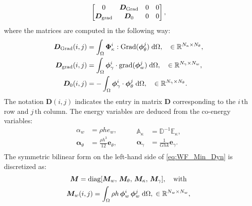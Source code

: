 \documentclass[preprint,12pt]{elsarticle}
\begin{document}
{\begin{equation}
\begin{bmatrix}
0 & \bm{D}_{\mathrm{Grad}} & 0 & 0         \vspace{.3mm}\\
\bm{D}_{\mathrm{grad}} & \bm{D}_0 & 0 & 0       \vspace{.3mm}\\
\end{bmatrix},
\end{equation}
where the matrices are computed in the following way:
\begin{equation}
\begin{aligned}
\bm{D}_{\mathrm{Grad}}(i,j) &= \int_{\Omega} \bm{\Phi}_{\kappa}^i : \mathrm{Grad} (\bm{\phi}_{\theta}^j) \d\Omega, \quad \in \mathbb{R}^{N_\kappa \times N_\theta},\\
\bm{D}_{\mathrm{grad}}(i,j) &= \int_{\Omega} \bm{\phi}_{\gamma}^i \cdot  \mathrm{grad}(\bm{\phi}^j_{w}) \d\Omega, \quad \in \mathbb{R}^{N_{\gamma} \times N_w},\\
\bm{D}_0(i,j)  &= -\int_{\Omega} \bm{\phi}_{\gamma}^i \cdot  \bm{\phi}^j_{\theta} \d\Omega, \quad \in \mathbb{R}^{N_{\gamma} \times N_\theta}. \\
\end{aligned}
\end{equation}
The notation $\bm{D}(i,j)$ indicates the entry in matrix $\bm{D}$ corresponding to the $i \, {\text{th}}$ row and $j \,{\text{th}}$ column. The energy variables are deduced from the co-energy variables:
\begin{equation}
\begin{aligned}
\alpha_w &= \rho h e_w, \\
\bm\alpha_{\theta} &=  \frac{\rho h^3}{12} \bm{e}_{\theta}, \\
\end{aligned} \qquad
\begin{aligned}
\mathbb{A}_{\kappa} &= \mathbb{D}^{-1} \mathbb{E}_{\kappa}, \\
\bm\alpha_{\gamma} &= \frac{1}{G h k} \bm{e}_{\gamma}. \\
\end{aligned}
\end{equation}
The symmetric bilinear form on the left-hand side of \eqref{eq:WF_Min_Dyn} is discretized as:
\begin{equation}
	\begin{gathered}
	\bm{M} = \text{diag}[\bm{M}_w,\, \bm{M}_\theta,\, \bm{M}_\kappa,\, \bm{M}_{\gamma}], \quad \text{with} \\
	\begin{aligned}
	&\bm{M}_w(i,j) = \int_{\Omega} \rho h \, \bm{\phi}_w^i \, \bm{\phi}_w^j \d\Omega, \; \in \mathbb{R}^{N_w \times N_w}, \\

\end{aligned}
\end{gathered}
\end{equation}}
\end{document}
